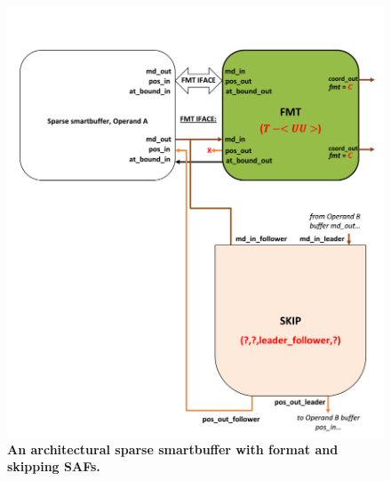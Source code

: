 \begin{figure}[ht]
\includegraphics[width=\textwidth]{figures/safinference_build_01concretization.png}
\caption{\textbf{An architectural sparse smartbuffer with format and skipping SAFs.}}
\label{fig:safinference_build_01concretization}
\centering
\end{figure}




